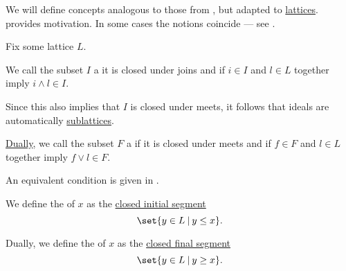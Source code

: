 \begin{definition}\label{def:lattice_ideal}
  We will define concepts analogous to those from , but adapted to \hyperref[def:semilattice/lattice]{lattices}.  provides motivation. In some cases the notions coincide --- see .

  Fix some lattice \( L \).

  \begin{thmenum}
    \begin{minipage}[t]{0.45\textwidth}
      We call the subset \( I \) a  it is closed under joins and if \( i \in I \) and \( l \in L \) together imply \( i \wedge l \in I \).

      Since this also implies that \( I \) is closed under meets, it follows that ideals are automatically \hyperref[def:semilattice/submodel]{sublattices}.
    \end{minipage}
    \hspace{0.02\textwidth}
    \begin{minipage}[t]{0.45\textwidth}
      \hyperref[thm:preorder_duality]{Dually}, we call the subset \( F \) a  if it is closed under meets and if \( f \in F \) and \( l \in L \) together imply \( f \vee l \in F \).

      An equivalent condition is given in .
    \end{minipage}

    \begin{minipage}[t]{0.45\textwidth}
      We define the  of \( x \) as the \hyperref[def:order_interval/ray]{closed initial segment}
      \begin{equation*}
        \set{ y \in L \given y \leq x }.
      \end{equation*}
    \end{minipage}
    \hspace{0.02\textwidth}
    \begin{minipage}[t]{0.45\textwidth}
      Dually, we define the  of \( x \) as the \hyperref[def:order_interval/ray]{closed final segment}
      \begin{equation*}
        \set{ y \in L \given y \geq x }.
      \end{equation*}
    \end{minipage}


\end{thmenum}
\end{definition}
